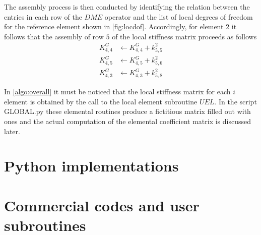 The assembly process is then conducted by identifying the relation between the entries in each row of the $DME$ operator and the list of local degrees of freedom for the reference element shown in \cref{fig:locdof}. Accordingly, for element 2 it follows that the assembly of row $5$ of the local stiffness matrix proceeds as follows
\begin{align*}
K_{4,4}^G & \leftarrow  K_{4,4}^G + k_{5,5}^2 \\
K_{4,5}^G & \leftarrow  K_{4,5}^G + k_{5,6}^2 \\
K_{4,3}^G & \leftarrow  K_{4,3}^G + k_{5,8}^2
\end{align*}

In \cref{algo:overall} it must be noticed that the local stiffness matrix for each $i$ element is obtained by the call to the local element subroutine $UEL$. In the script GLOBAL.py these elemental routines produce a fictitious matrix filled out with ones and the actual computation of the elemental coefficient matrix is discussed later.

\section{Python implementations}

\section{Commercial codes and user subroutines}





